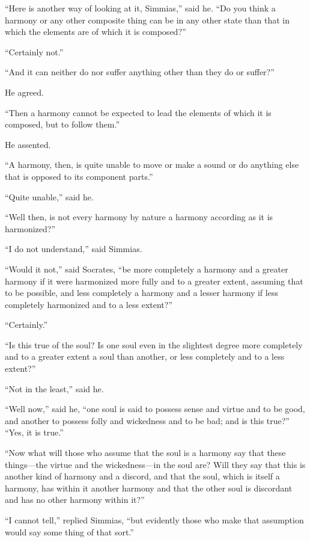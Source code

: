 \documentclass[letterpaper,12pt]{article}
\newcommand{\stephpag}[1]{\marginnote{\small\itshape\fontfamily{ppl}\selectfont #1}}
\begin{document}
\begin{drama}
``Here is another way of looking at it, Simmias,'' said he. ``Do you think a harmony or any other composite thing can be in any other state \stephpag{93 a} than that in which the elements are of which it is composed?''
 
``Certainly not.''
 
``And it can neither do nor suffer anything other than they do or suffer?''
 
He agreed.
 
``Then a harmony cannot be expected to lead the elements of which it is composed, but to follow them.''
 
He assented.
 
``A harmony, then, is quite unable to move or make a sound or do anything else that is opposed to its component parts.''
 
``Quite unable,'' said he.
 
``Well then, is not every harmony by nature a harmony according as it is harmonized?''
 
``I do not understand,'' said Simmias.
 
``Would it not,'' said Socrates, ``be more completely a harmony \stephpag{b} and a greater harmony if it were harmonized more fully and to a greater extent, assuming that to be possible, and less completely a harmony and a lesser harmony if less completely harmonized and to a less extent?''
 
``Certainly.''
 
``Is this true of the soul? Is one soul even in the slightest degree more completely and to a greater extent a soul than another, or less completely and to a less extent?''
 
``Not in the least,'' said he.
 
``Well now,'' said he, ``one soul is said to possess sense and virtue and to be good, and another to possess folly and wickedness and to be bad; and is this true?'' \stephpag{c} ``Yes, it is true.''
 
``Now what will those who assume that the soul is a harmony say that these things---the virtue and the wickedness---in the soul are? Will they say that this is another kind of harmony and a discord, and that the soul, which is itself a harmony, has within it another harmony and that the other soul is discordant and has no other harmony within it?''
 
``I cannot tell,'' replied Simmias, ``but evidently those who make that assumption would say some thing of that sort.''
 

\end{drama}
\end{document}
